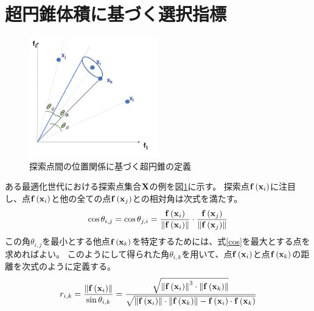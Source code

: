 \documentclass[10pt, a4paper, titlepage]{jarticle}
\begin{document}
\newpage
\section{超円錐体積に基づく選択指標}

\begin{figure}[b]
\begin{center}
\includegraphics[width=0.5\textwidth]{hv.png}
\end{center}
\label{hypercone}
\caption{
探索点間の位置関係に基づく超円錐の定義
}
\end{figure}
ある最適化世代における探索点集合${\bf X}$の例を図\ref{hypercone}に示す。
探索点${\bf f}\left( {\bf x}_i \right)$に注目し、点${\bf f}\left( {\bf x}_i \right)$と他の全ての点${\bf f}\left( {\bf x}_j \right)$との相対角は次式を満たす。
\begin{equation}
\cos \theta_{i,j} = \cos \theta_{j,i} = 
\frac{ {\bf f}\left( {\bf x}_i \right) }{\left\| {\bf f}\left( {\bf x}_i \right) \right\|}
\cdot
\frac{ {\bf f}\left( {\bf x}_j \right) }{\left\| {\bf f}\left( {\bf x}_j \right) \right\|}
\label{cos}
\end{equation}
この角$\theta_{i,j}$を最小とする他点${\bf f}\left( {\bf x}_k \right)$を特定するためには、式\ref{cos}を最大とする点を求めればよい。
このようにして得られた角$\theta_{i,k}$を用いて、点${\bf f}\left( {\bf x}_i \right)$と点${\bf f}\left( {\bf x}_k \right)$の距離を次式のように定義する。
\begin{equation}
r_{i,k} = \frac{ \left\| {\bf f}\left( {\bf x}_i \right) \right\| }
{ \sin \theta_{i,k}}
= \frac{\sqrt{ \left\| {\bf f}\left( {\bf x}_i \right) \right\|^3\cdot \left\| {\bf f}\left( {\bf x}_k \right) \right\| }}
{\sqrt{ \left\| {\bf f}\left( {\bf x}_i \right) \right\|\cdot \left\| {\bf f}\left( {\bf x}_k \right) \right\| - {\bf f}\left( {\bf x}_i \right)\cdot {\bf f}\left( {\bf x}_k \right)}}
\end{equation}
\end{document}
